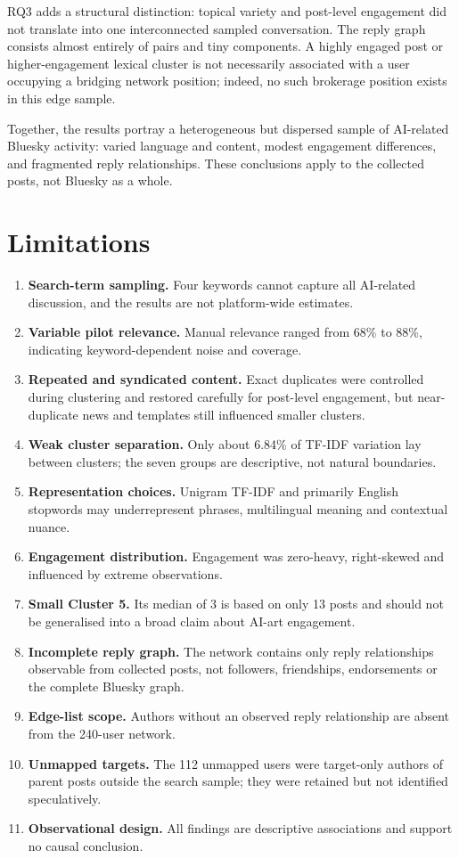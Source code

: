 \documentclass[
]{article}
\providecommand{\tightlist}{%
  \setlength{\itemsep}{0pt}\setlength{\parskip}{0pt}}
\begin{document}
RQ3 adds a structural distinction: topical variety and post-level
engagement did not translate into one interconnected sampled
conversation. The reply graph consists almost entirely of pairs and tiny
components. A highly engaged post or higher-engagement lexical cluster
is not necessarily associated with a user occupying a bridging network
position; indeed, no such brokerage position exists in this edge sample.

Together, the results portray a heterogeneous but dispersed sample of
AI-related Bluesky activity: varied language and content, modest
engagement differences, and fragmented reply relationships. These
conclusions apply to the collected posts, not Bluesky as a whole.

\section{Limitations}\label{limitations}

\begin{enumerate}
\def\labelenumi{\arabic{enumi}.}
\tightlist
\item
  \textbf{Search-term sampling.} Four keywords cannot capture all
  AI-related discussion, and the results are not platform-wide
  estimates.
\item
  \textbf{Variable pilot relevance.} Manual relevance ranged from 68\%
  to 88\%, indicating keyword-dependent noise and coverage.
\item
  \textbf{Repeated and syndicated content.} Exact duplicates were
  controlled during clustering and restored carefully for post-level
  engagement, but near-duplicate news and templates still influenced
  smaller clusters.
\item
  \textbf{Weak cluster separation.} Only about 6.84\% of TF-IDF
  variation lay between clusters; the seven groups are descriptive, not
  natural boundaries.
\item
  \textbf{Representation choices.} Unigram TF-IDF and primarily English
  stopwords may underrepresent phrases, multilingual meaning and
  contextual nuance.
\item
  \textbf{Engagement distribution.} Engagement was zero-heavy,
  right-skewed and influenced by extreme observations.
\item
  \textbf{Small Cluster 5.} Its median of 3 is based on only 13 posts
  and should not be generalised into a broad claim about AI-art
  engagement.
\item
  \textbf{Incomplete reply graph.} The network contains only reply
  relationships observable from collected posts, not followers,
  friendships, endorsements or the complete Bluesky graph.
\item
  \textbf{Edge-list scope.} Authors without an observed reply
  relationship are absent from the 240-user network.
\item
  \textbf{Unmapped targets.} The 112 unmapped users were target-only
  authors of parent posts outside the search sample; they were retained
  but not identified speculatively.
\item
  \textbf{Observational design.} All findings are descriptive
  associations and support no causal conclusion.
\end{enumerate}
\end{document}
